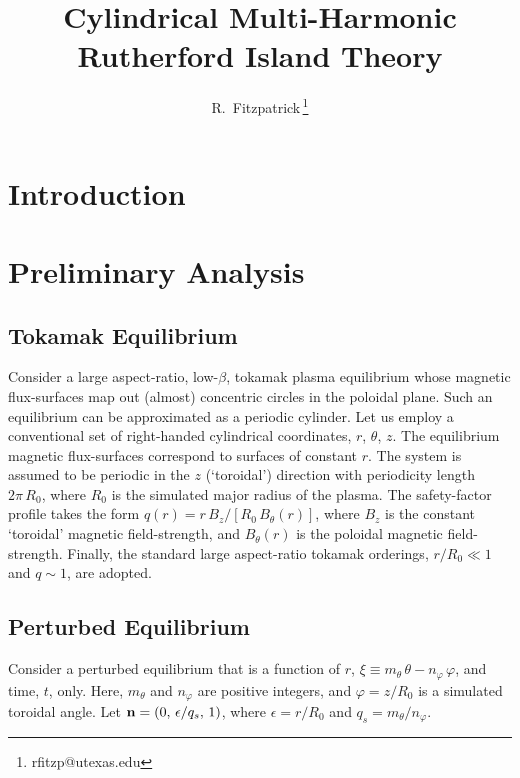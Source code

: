 \documentclass[12pt,prb,aps]{revtex4-1}
\begin{document}
\title{Cylindrical Multi-Harmonic Rutherford Island Theory}

\author{R.~Fitzpatrick\,\footnote{rfitzp@utexas.edu}}


\maketitle

\section{Introduction}
\section{Preliminary Analysis}
\subsection{Tokamak Equilibrium}
Consider a large aspect-ratio, low-$\beta$,  tokamak plasma equilibrium whose magnetic flux-surfaces map out (almost)
concentric circles in the poloidal plane. Such an equilibrium can be approximated as a periodic cylinder.\cite{wesson1} Let us employ a conventional set of right-handed cylindrical coordinates, $r$, $\theta$, $z$. The
equilibrium magnetic flux-surfaces correspond to surfaces of constant $r$. The system is assumed to be periodic
in the $z$ (`toroidal') direction with periodicity length
$2\pi\,R_0$, where $R_0$ is the simulated major radius of the plasma. The safety-factor profile takes the form
$q(r) = r\,B_z/[R_0\,B_\theta(r)]$, where $B_z$ is the
constant `toroidal' magnetic field-strength, and $B_\theta(r)$ is the poloidal magnetic field-strength.  Finally, the standard large aspect-ratio tokamak orderings, $r/R_0\ll 1$ and $q\sim 1$, are adopted.\cite{rf0}

\subsection{Perturbed Equilibrium}
Consider a perturbed equilibrium that is a function of
$r$, $\xi\equiv m_\theta\,\theta-n_\varphi\,\varphi$,
and time, $t$, only. Here, $m_\theta$ and $n_\varphi$ are positive integers, and $\varphi= z/R_0$ is a simulated
toroidal angle. Let ${\bf n} = (0,\,\epsilon/q_s,\,1)$,
where $\epsilon = r/R_0$ and $q_s=m_\theta/n_\varphi$. 
\end{document}
